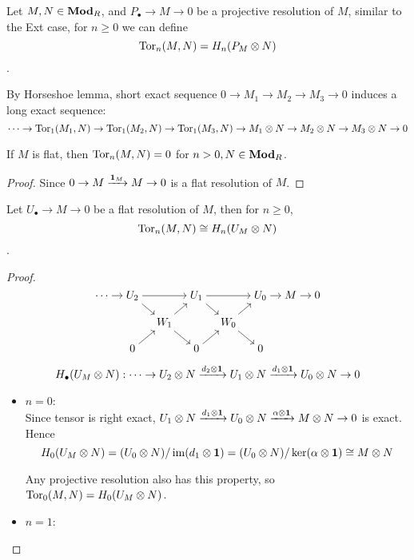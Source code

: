 \begin{definition}
  Let $M, N \in \mathbf{Mod}_R$, and $P_\bullet \to M \to 0$ be a projective resolution of $M$, 
  similar to the Ext case, for $n \ge 0$ we can define
  $$\operatorname{Tor}_n(M, N) = H_n(P_M \otimes N)$$.
\end{definition}

\begin{fact}
  By Horseshoe lemma, short exact sequence $0 \to M_1 \to M_2 \to M_3 \to 0$
  induces a long exact sequence:
  $$\cdots \to \operatorname{Tor}_1(M_1, N) \to \operatorname{Tor}_1(M_2, N) \to \operatorname{Tor}_1(M_3, N) \to 
  M_1 \otimes N \to M_2 \otimes N \to M_3 \otimes N \to 0$$
\end{fact}

\begin{prop}
  If $M$ is flat, then $\operatorname{Tor}_n(M, N) = 0$ for $n > 0, N \in \mathbf{Mod}_R$.
  \begin{proof}
    Since $0 \to M \xrightarrow{\mathbf{1}_M} M \to 0$ is a flat resolution of $M$. 
  \end{proof}
\end{prop}

\begin{theorem}
  Let $U_\bullet \to M \to 0$ be a flat resolution of $M$, then for $n \ge 0$,
  $$\operatorname{Tor}_n(M, N) \cong H_n(U_M \otimes N)$$.
  \begin{proof}
    $$
      \begin{tikzcd}[cramped, sep=10pt]
        \cdots \ar[r] & U_2 \ar[rr] \ar[rd] && U_1 \ar[rr] \ar[rd] && U_0 \ar[r] & M \ar[r] & 0 \\
                      && W_1 \ar[ru] \ar[rd] && W_0 \ar[ru] \ar[rd] \\
                      & 0 \ar[ru] && 0 \ar[ru] && 0
      \end{tikzcd}
    $$

    $$H_\bullet(U_M \otimes N) : \cdots \to U_2 \otimes N \xrightarrow{d_2 \otimes \mathbf{1}} 
    U_1 \otimes N \xrightarrow{d_1 \otimes \mathbf{1}} U_0 \otimes N \to 0$$

    \begin{itemize}
      \item $n=0$: \\ 
        Since tensor is right exact, 
        $U_1 \otimes N \xrightarrow{d_1 \otimes \mathbf{1}} U_0 \otimes N \xrightarrow{\alpha \otimes \mathbf{1}} M \otimes N \to 0$
        is exact.
        Hence
        $$H_0(U_M \otimes N) = (U_0 \otimes N) / \operatorname{im}(d_1 \otimes \mathbf{1}) = (U_0 \otimes N) / \ker(\alpha \otimes \mathbf{1})
        \cong M \otimes N$$

        Any projective resolution also has this property, so $\operatorname{Tor}_0(M, N) = H_0(U_M \otimes N)$.

      \item $n=1$: \\

    \end{itemize}

  \end{proof}
\end{theorem}
